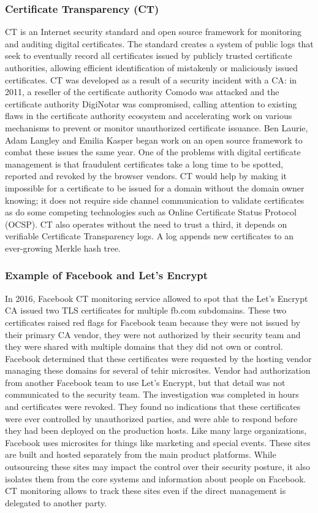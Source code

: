 \documentclass[a4paper, 10pt, titlepage]{article}
\begin{document}
\subsubsection{Certificate Transparency (CT)}
CT is an Internet security standard and open source framework for monitoring and auditing digital certificates. The standard creates a system of public logs that seek to eventually record all certificates issued by publicly trusted certificate authorities, allowing efficient identification of mistakenly or maliciously issued certificates.
CT was developed as a result of a security incident with a CA: in 2011, a reseller of the certificate authority Comodo was attacked and the certificate authority DigiNotar was compromised, calling attention to existing flaws in the certificate authority ecosystem and accelerating work on various mechanisms to prevent or monitor unauthorized certificate issuance. Ben Laurie, Adam Langley and Emilia Kasper began work on an open source framework to combat these issues the same year. 
One of the problems with digital certificate management is that fraudulent certificates take a long time to be spotted, reported and revoked by the browser vendors. CT would help by making it impossible for a certificate to be issued for a domain without the domain owner knowing; it does not require side channel communication to validate certificates as do some competing technologies such as Online Certificate Status Protocol (OCSP). CT also operates without the need to trust a third, it depends on verifiable Certificate Transparency logs. A log appends new certificates to an ever-growing Merkle hash tree.

\subsubsection*{Example of Facebook and Let's Encrypt}
In 2016, Facebook CT monitoring service allowed to spot that the Let's Encrypt CA issued two TLS certificates for multiple fb.com subdomains. These two certificates raised red flags for Facebook team because they were not issued by their primary CA vendor, they were not authorized by their security team and they were shared with multiple domains that they did not own or control.\\
Facebook determined that these certificates were requested by the hosting vendor managing these domains for several of tehir microsites. Vendor had authorization from another Facebook team to use Let's Encrypt, but that detail was not communicated to the security team. The investigation was completed in hours and certificates were revoked. They found no indications that these certificates were ever controlled by unauthorized parties, and were able to respond before they had been deployed on the production hosts.
Like many large organizations, Facebook uses microsites for things like marketing and special events. These sites are built and hosted separately from the main product platforms. While outsourcing these sites may impact the control over their security posture, it also isolates them from the core systems and information about people on Facebook. CT monitoring allows to track these sites even if the direct management is delegated to another party.
\end{document}

